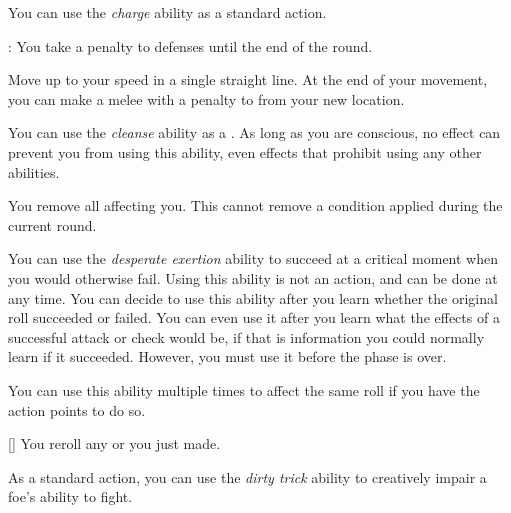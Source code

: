          You can use the \textit{charge} ability as a standard action.

        \begin{freeability}{}
            : You take a  penalty to defenses until the end of the round.

            Move up to your speed in a single straight line.
            At the end of your movement, you can make a melee  with a  penalty to  from your new location.
        \end{freeability}

         You can use the \textit{cleanse} ability as a .
        As long as you are conscious, no effect can prevent you from using this ability, even effects that prohibit using any other abilities.
        \begin{apability}{}
            You remove all  affecting you.
            This cannot remove a condition applied during the current round.
        \end{apability}

         You can use the \textit{desperate exertion} ability to succeed at a critical moment when you would otherwise fail.
        Using this ability is not an action, and can be done at any time.
        You can decide to use this ability after you learn whether the original roll succeeded or failed.
        You can even use it after you learn what the effects of a successful attack or check would be, if that is information you could normally learn if it succeeded.
        However, you must use it before the phase is over.

        You can use this ability multiple times to affect the same roll if you have the action points to do so.

        \begin{apability}{}[]
            You reroll any  or  you just made.
        \end{apability}

         As a standard action, you can use the \textit{dirty trick} ability to creatively impair a foe's ability to fight.

